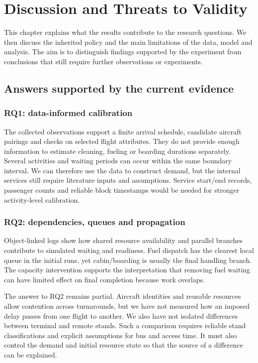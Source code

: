 \chapter{Discussion and Threats to Validity}
\label{ch:discussion}

This chapter explains what the results contribute to the research questions. We then discuss the inherited policy and the main limitations of the data, model and analysis. The aim is to distinguish findings supported by the experiment from conclusions that still require further observations or experiments.

\section{Answers supported by the current evidence}
\subsection{RQ1: data-informed calibration}
The collected observations support a finite arrival schedule, candidate aircraft pairings and checks on selected flight attributes. They do not provide enough information to estimate cleaning, fueling or boarding durations separately. Several activities and waiting periods can occur within the same boundary interval. We can therefore use the data to construct demand, but the internal services still require literature inputs and assumptions. Service start/end records, passenger counts and reliable block timestamps would be needed for stronger activity-level calibration.

\subsection{RQ2: dependencies, queues and propagation}
Object-linked logs show how shared resource availability and parallel branches contribute to simulated waiting and readiness. Fuel dispatch has the clearest local queue in the initial runs, yet cabin/boarding is usually the final handling branch. The capacity intervention supports the interpretation that removing fuel waiting can have limited effect on final completion because work overlaps.

The answer to RQ2 remains partial. Aircraft identities and reusable resources allow contention across turnarounds, but we have not measured how an imposed delay passes from one flight to another. We also have not isolated differences between terminal and remote stands. Such a comparison requires reliable stand classifications and explicit assumptions for bus and access time. It must also control the demand and initial resource state so that the source of a difference can be explained.

